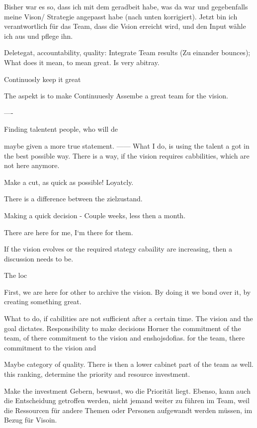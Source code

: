 Bisher war es so, dass ich mit dem geradbeit habe, was da war und gegebenfalls meine Vison/ Strategie angepasst habe (nach unten korrigiert).
Jetzt bin ich verantwortlich für das Team, dass die Vsion erreicht wird, und den Input wähle ich aus und pflege ihn.

Deletegat, accountability, quality: Integrate Team results (Zu einander bounces); 
What does it mean, to mean great. Is very abitray.


Continuosly keep it great

The aspekt is to make Continuuesly Assembe a great team for the vision.

—-






Finding talentent people, who will de

maybe given a more true statement.
——
What I do, is using the talent a got in the best possible way. 
There is a way, if the vision requires cabbilities, which are not here anymore.

Make a cut, as quick as possible!
Loyatcly. 

There is a difference between the zielzustand.

Making a quick decision - Couple weeks, less then a month.

There are here for me, I‘m there for them.

If the vision evolves or the required stategy cabaility are increasing, then a discussion needs to be.


The loc

First, we are here for other to archive the vision. By doing it we bond over it, by creating something great.

What to do, if cabilities are not sufficient after a certain time. 
The vision and the goal dictates.
Responsibility to make decisions 
Horner the commitment of the team, of there commitment to the vision and enshojsdofias.
for the team, there commitment to the vision and 

Maybe category of quality.
There is then a lower cabinet part of the team as well. 
this ranking, determine the priority and resource investment.

Make the investment Gebern, bewusst, wo die Priorität liegt.
Ebenso, kann auch die Entscheidung getroffen werden, nicht jemand weiter zu führen im Team, weil die Ressourcen für andere Themen oder Personen aufgewandt werden müssen, im Bezug für Visoin.

